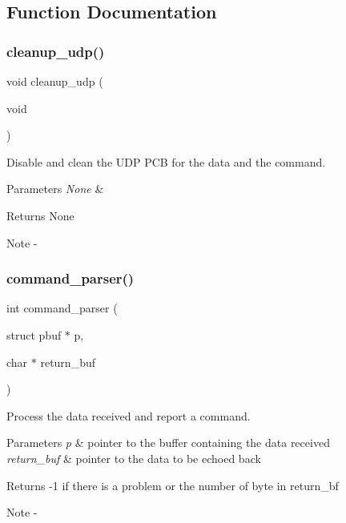 \subsection{Function Documentation}
\mbox{\label{udp__peripheral_8c_ad88f9f0378dd06c17528eb9f203c2467}} 
\subsubsection{cleanup\_udp()}
{\footnotesize\ttfamily void cleanup\+\_\+udp (\begin{DoxyParamCaption}\item[{void}]{ }\end{DoxyParamCaption})}



Disable and clean the U\+DP P\+CB for the data and the command. 


\begin{DoxyParams}{Parameters}
{\em None} & \\
\hline
\end{DoxyParams}
\begin{DoxyReturn}{Returns}
None
\end{DoxyReturn}
\begin{DoxyNote}{Note}
-\/ 
\end{DoxyNote}
\mbox{\label{udp__peripheral_8c_a4f92cb22c72184c5a93a83fb85490c24}} 
\subsubsection{command\_parser()}
{\footnotesize\ttfamily int command\+\_\+parser (\begin{DoxyParamCaption}\item[{struct pbuf $\ast$}]{p,  }\item[{char $\ast$}]{return\+\_\+buf }\end{DoxyParamCaption})}



Process the data received and report a command. 


\begin{DoxyParams}{Parameters}
{\em p} & pointer to the buffer containing the data received \\
\hline
{\em return\+\_\+buf} & pointer to the data to be echoed back\\
\hline
\end{DoxyParams}
\begin{DoxyReturn}{Returns}
-\/1 if there is a problem or the number of byte in return\+\_\+bf
\end{DoxyReturn}
\begin{DoxyNote}{Note}
-\/ 
\end{DoxyNote}
\mbox{\label{udp__peripheral_8c_acf75bb5ef6105dd155ddc36f84a71606}} 
